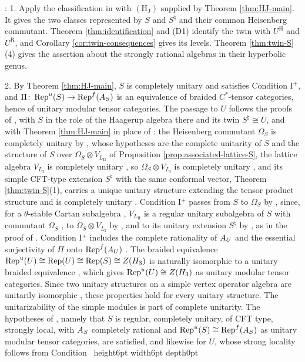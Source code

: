 \documentclass[leqno]{article}
\let\cal\relax
\newcommand{\cal}{\mathcal}
\newcommand{\qed}{\hfill \vrule height6pt  width6pt depth0pt}
\newcommand{\co}{\colon}
\newcommand{\ot}{\otimes}
\DeclareMathOperator{\Rep}{Rep}
\newenvironment{proof}[1][]{\noindent {\it Proof #1} : }{\hbox{~}\qed
\smallskip
}
\numberwithin{equation}{section}
\begin{document}
\begin{proof}
1. Apply the classification in \cite[Theorem 12.4(1),(4)]{Arh26} with $\mathrm{(H_J)}$ supplied by Theorem \ref{thm:HJ-main}. It gives the two classes represented by $S$ and $S^\natural$ and their common Heisenberg commutant. Theorem \ref{thm:identification} and \textup{(D1)} identify the twin with $U^{\mathrm H}$ and $U^{\mathrm R}$, and Corollary \ref{cor:twin-consequences} gives its levels. Theorem \ref{thm:twin-S}(4) gives the assertion about the strongly rational algebras in their hyperbolic genus.

2. By Theorem \ref{thm:HJ-main}, $S$ is completely unitary and satisfies Condition I$^+$, and $\Pi \co \Rep^u(S) \to \Rep^f(\cal A_S)$ is an equivalence of braided $C^*$-tensor categories, hence of unitary modular tensor categories. The passage to $U$ follows the proofs of \cite[Theorem 8.3(1) and Corollary 8.5(1)]{ArhII}, with $S$ in the role of the Haagerup algebra there and its twin $S^\natural \cong U$, and with Theorem \ref{thm:HJ-main} in place of \cite[Theorem 7.17]{ArhII}: the Heisenberg commutant $\Omega_S$ is completely unitary by \cite[Lemma 8.2]{ArhII}, whose hypotheses are the complete unitarity of $S$ and the structure of $S$ over $\Omega_S \ot V_{L_{\mathrm{II}}}$ of Proposition \ref{prop:associated-lattice-S}, the lattice algebra $V_{L_{\mathrm I}}$ is completely unitary \cite[Corollary 3.32 p.~49]{Gui22}, so $\Omega_S \ot V_{L_{\mathrm I}}$ is completely unitary \cite[Proposition 3.31 p.~48]{Gui22}, and its simple CFT-type extension $S^\natural$ with the same conformal vector, Theorem \ref{thm:twin-S}(1), carries a unique unitary structure extending the tensor product structure and is completely unitary \cite[Theorem 4.7 p.~19]{CGGH23}. Condition I$^+$ passes from $S$ to $\Omega_S$ by \cite[Theorem 6.18(3) p.~70]{Gui25}, since, for a $\theta$-stable Cartan subalgebra \cite[Lemma 8.1]{ArhII}, $V_{L_{\mathrm{II}}}$ is a regular unitary subalgebra of $S$ with commutant $\Omega_S$ \cite[proof of Lemma 8.2]{ArhII}, to $\Omega_S \ot V_{L_{\mathrm I}}$ by \cite[Theorem 6.18(1) and Example 6.19(b) pp.~70--71]{Gui25}, and to its unitary extension $S^\natural$ by \cite[Theorem 6.18(2) p.~70]{Gui25}, as in the proof of \cite[Corollary 8.5(1)]{ArhII}. Condition I$^+$ includes the complete rationality of $\cal A_U$ and the essential surjectivity of $\Pi$ onto $\Rep^f(\cal A_U)$ \cite[Theorem 6.14 pp.~68--69]{Gui25}. The braided equivalence $\Rep^u(U) \cong \Rep(U) \cong \Rep(S) \cong Z(\cal H_3)$ is naturally isomorphic to a unitary braided equivalence \cite[Theorem 5]{Reu23}, which gives $\Rep^u(U) \cong Z(\cal H_3)$ as unitary modular tensor categories. Since two unitary structures on a simple vertex operator algebra are unitarily isomorphic \cite[Proposition 5.19 pp.~40--41]{CKLW18}, these properties hold for every unitary structure. The unitarizability of the simple modules is part of complete unitarity. The hypotheses of \cite[Theorem 4.10 p.~21]{CGGH23}, namely that $S$ is regular, completely unitary, of CFT type, strongly local, with $\cal A_S$ completely rational and $\Rep^u(S) \cong \Rep^f(\cal A_S)$ as unitary modular tensor categories, are satisfied, and likewise for $U$, whose strong locality follows from Condition 
\end{proof}
\end{document}
